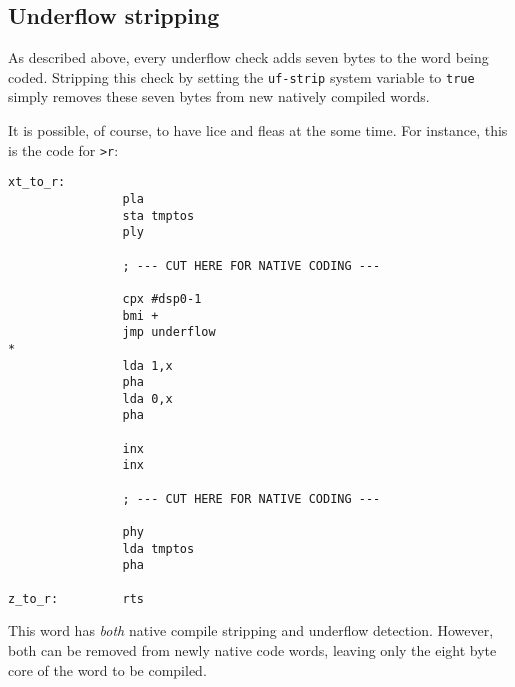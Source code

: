 \subsection{Underflow stripping}

As described above, every underflow check adds seven bytes to the
word being coded. Stripping this check by setting the
\texttt{uf-strip} system variable to
\texttt{true} simply removes these seven bytes from new
natively compiled words. 

It is possible, of course, to have lice and fleas at the some time. For
instance, this is the code for \texttt{>r}:

\begin{lstlisting}[frame=lines]
xt_to_r:
                pla
                sta tmptos
                ply

                ; --- CUT HERE FOR NATIVE CODING ---

                cpx #dsp0-1
                bmi +
                jmp underflow
*
                lda 1,x
                pha
                lda 0,x
                pha

                inx
                inx

                ; --- CUT HERE FOR NATIVE CODING ---

                phy
                lda tmptos
                pha

z_to_r:         rts
\end{lstlisting}

\noindent This word has \textit{both} native compile stripping and underflow
detection. However, both can be removed from newly native code words, leaving
only the eight byte core of the word to be compiled.
